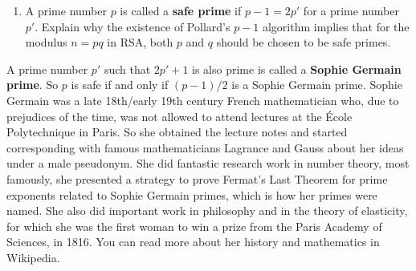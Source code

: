 \begin{problem}
\begin{enumerate}
\begin{Answer}
\end{Answer}

\item A prime number $p$ is called a \textbf{safe prime} if $p-1 =
2p'$ for a prime number $p'$.  Explain why the existence of Pollard's
$p-1$ algorithm implies that for the modulus $n=pq$ in RSA, both $p$
and $q$ should be chosen to be safe primes.
\end{enumerate}

\medskip

A prime number $p'$ such that $2p'+1$ is also prime is called a
\textbf{Sophie Germain prime}.  So $p$ is safe if and only if
$(p-1)/2$ is a Sophie Germain prime.  Sophie Germain was a late
18th/early 19th century French mathematician who, due to prejudices of
the time, was not allowed to attend lectures at the \'Ecole
Polytechnique in Paris.  So she obtained the lecture notes and started
corresponding with famous mathematicians Lagrance and Gauss about her
ideas under a male pseudonym.  She did fantastic research work in
number theory, most famously, she presented a strategy to prove
Fermat's Last Theorem for prime exponents related to Sophie Germain
primes, which is how her primes were named.  She also did important
work in philosophy and in the theory of elasticity, for which she was
the first woman to win a prize from the Paris Academy of Sciences, in
1816.  You can read more about her history and mathematics in
Wikipedia.
\end{problem}
